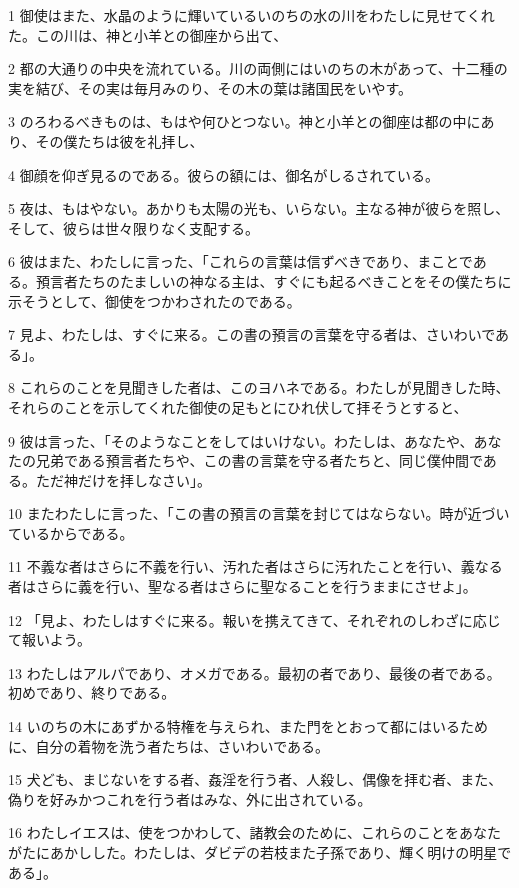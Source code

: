 \par 1 御使はまた、水晶のように輝いているいのちの水の川をわたしに見せてくれた。この川は、神と小羊との御座から出て、
\par 2 都の大通りの中央を流れている。川の両側にはいのちの木があって、十二種の実を結び、その実は毎月みのり、その木の葉は諸国民をいやす。
\par 3 のろわるべきものは、もはや何ひとつない。神と小羊との御座は都の中にあり、その僕たちは彼を礼拝し、
\par 4 御顔を仰ぎ見るのである。彼らの額には、御名がしるされている。
\par 5 夜は、もはやない。あかりも太陽の光も、いらない。主なる神が彼らを照し、そして、彼らは世々限りなく支配する。
\par 6 彼はまた、わたしに言った、「これらの言葉は信ずべきであり、まことである。預言者たちのたましいの神なる主は、すぐにも起るべきことをその僕たちに示そうとして、御使をつかわされたのである。
\par 7 見よ、わたしは、すぐに来る。この書の預言の言葉を守る者は、さいわいである」。
\par 8 これらのことを見聞きした者は、このヨハネである。わたしが見聞きした時、それらのことを示してくれた御使の足もとにひれ伏して拝そうとすると、
\par 9 彼は言った、「そのようなことをしてはいけない。わたしは、あなたや、あなたの兄弟である預言者たちや、この書の言葉を守る者たちと、同じ僕仲間である。ただ神だけを拝しなさい」。
\par 10 またわたしに言った、「この書の預言の言葉を封じてはならない。時が近づいているからである。
\par 11 不義な者はさらに不義を行い、汚れた者はさらに汚れたことを行い、義なる者はさらに義を行い、聖なる者はさらに聖なることを行うままにさせよ」。
\par 12 「見よ、わたしはすぐに来る。報いを携えてきて、それぞれのしわざに応じて報いよう。
\par 13 わたしはアルパであり、オメガである。最初の者であり、最後の者である。初めであり、終りである。
\par 14 いのちの木にあずかる特権を与えられ、また門をとおって都にはいるために、自分の着物を洗う者たちは、さいわいである。
\par 15 犬ども、まじないをする者、姦淫を行う者、人殺し、偶像を拝む者、また、偽りを好みかつこれを行う者はみな、外に出されている。
\par 16 わたしイエスは、使をつかわして、諸教会のために、これらのことをあなたがたにあかしした。わたしは、ダビデの若枝また子孫であり、輝く明けの明星である」。
